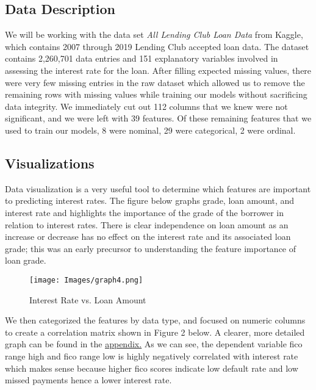 \documentclass[twocolumn]{article}
\begin{document}
\subsection{Data Description}
\par{\hspace{18}We will be working with the data set \textit{All Lending Club Loan Data} from Kaggle, which contains 2007 through 2019 Lending Club accepted loan data. The dataset contains 2,260,701 data entries and 151 explanatory variables involved in assessing the interest rate for the loan. After filling expected missing values, there were very few missing entries in the raw dataset which allowed us to remove the remaining rows with missing values while training our models without sacrificing data integrity. We immediately cut out 112 columns that we knew were not significant, and we were left with 39 features. Of these remaining features that we used to train our models, 8 were nominal, 29 were categorical, 2 were ordinal. }

\subsection{Visualizations}
\par{\hspace{18}Data visualization is a very useful tool to determine which features are important to predicting interest rates. The figure below graphs grade, loan amount, and interest rate and highlights the importance of the grade of the borrower in relation to interest rates. There is clear independence on loan amount as an increase or decrease has no effect on the interest rate and its associated loan grade; this was an early precursor to understanding the feature importance of loan grade. 
}


\begin{figure}[h!]
\centering
\texttt{[image: Images/graph4.png]}
\caption{Interest Rate vs. Loan Amount}
\end{figure}

\par{We then categorized the features by data type, and focused on numeric columns to create a correlation matrix shown in Figure 2 below. A clearer, more detailed graph can be found in the \hyperref[sec:pseudo]{\underline{appendix.}} As we can see, the dependent variable \“fico range high\” and \“fico range low\” is highly negatively correlated with interest rate which makes sense because higher fico scores indicate low default rate and low missed payments hence a lower interest rate. }
\end{document}
